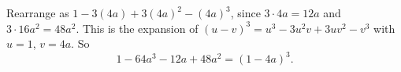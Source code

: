 Rearrange as $1-3(4a)+3(4a)^2-(4a)^3$, since $3\cdot4a=12a$ and $3\cdot16a^2=48a^2$. This is the expansion of $(u-v)^3=u^3-3u^2v+3uv^2-v^3$ with $u=1$, $v=4a$. So
\[
1-64a^3-12a+48a^2=\boxed{(1-4a)^3}.
\]
